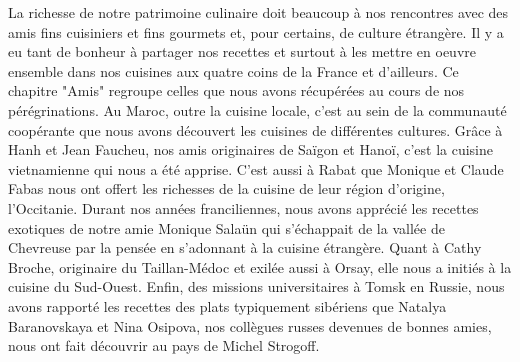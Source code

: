La richesse de notre patrimoine culinaire doit beaucoup à nos rencontres avec des amis fins cuisiniers et fins gourmets et, pour certains, de culture étrangère. Il y a eu tant de bonheur à partager nos recettes et surtout à les mettre en oeuvre ensemble dans nos cuisines aux quatre coins de la France et d'ailleurs. Ce chapitre "Amis" regroupe celles que nous avons récupérées au cours de nos pérégrinations. Au Maroc, outre la cuisine locale, c'est au sein de la communauté coopérante que nous avons découvert les cuisines de différentes cultures. Grâce à Hanh et Jean Faucheu, nos amis originaires de Saïgon et Hanoï, c'est la cuisine vietnamienne qui nous a été apprise. C'est aussi à Rabat que Monique et Claude Fabas nous ont offert les richesses de la cuisine de leur région d'origine, l'Occitanie. Durant nos années franciliennes, nous avons apprécié les recettes exotiques de notre amie Monique Salaün qui s'échappait de la vallée de Chevreuse par la pensée en s'adonnant à la cuisine étrangère. Quant à Cathy Broche, originaire du Taillan-Médoc et exilée aussi à Orsay, elle nous a initiés à la cuisine du Sud-Ouest. Enfin, des missions universitaires à Tomsk en Russie, nous avons rapporté les recettes des plats typiquement sibériens que Natalya Baranovskaya et Nina Osipova, nos collègues russes devenues de bonnes amies, nous ont fait découvrir au pays de Michel Strogoff.   
